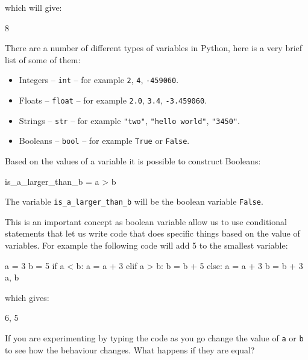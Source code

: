 which will give:

\begin{pyout}
8
\end{pyout}

There are a number of different types of variables in Python, here is a very
brief list of some of them:

\begin{itemize}
    \item Integers -- \texttt{int} -- for example \texttt{2},
        \texttt{4}, \texttt{-459060}.
    \item Floats -- \texttt{float} -- for example \texttt{2.0},
        \texttt{3.4}, \texttt{-3.459060}.
    \item Strings -- \texttt{str} -- for example \texttt{"two"}, \texttt{"hello
        world"}, \texttt{"3450"}.
    \item Booleans -- \texttt{bool} -- for example \texttt{True} or
        \texttt{False}.
\end{itemize}

Based on the values of a variable it is possible to construct Booleans:

\begin{pyin}
is_a_larger_than_b = a > b
\end{pyin}

The variable \texttt{is_a_larger_than_b} will be the boolean variable
\texttt{False}.

This is an important concept as boolean variable allow us to use conditional
statements that let us write code that does specific things based on the value
of variables. For example the following code will add 5 to the smallest
variable:

\begin{pyin}
a = 3
b = 5
if a < b:
    a = a + 3
elif a > b:
    b = b + 5
else:
    a = a + 3
    b = b + 3
a, b
\end{pyin}

which gives:

\begin{pyout}
6, 5
\end{pyout}

If you are experimenting by typing the code as you go change the value of
\texttt{a} or \texttt{b} to see how the behaviour changes.
What happens if they are equal?

